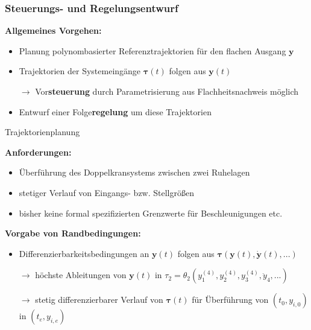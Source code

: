 \documentclass[
	ngerman,
	10pt,				%
	aspectratio=169 	%
]{beamer}
\begin{document}

\begin{frame}[label=control]
	\frametitle{Steuerungs- und Regelungsentwurf}
	\textbf{Allgemeines Vorgehen:}
	\begin{itemize}
		\item Planung polynombasierter Referenztrajektorien für den flachen Ausgang $\mathbf{y}$
		\pause
		\item Trajektorien der Systemeingänge $\boldsymbol{\tau}(t)$ folgen aus $\mathbf{y}(t)$
		\pause
		\item[$\rightarrow$] Vor\textbf{steuerung} durch Parametrisierung aus Flachheitsnachweis möglich
		\pause
		\item Entwurf einer Folge\textbf{regelung} um diese Trajektorien
	\end{itemize}

\end{frame}


\begin{frame}[t,fragile,label=trajektorien_1]{\large Trajektorienplanung}
	
	\textbf{Anforderungen:}
	\begin{itemize}
		\pause
		\item Überführung des Doppelkransystems zwischen zwei Ruhelagen
		\pause
		\item stetiger Verlauf von Eingangs- bzw. Stellgrößen
		\pause
		\item bisher keine formal spezifizierten Grenzwerte für Beschleunigungen etc.
	\end{itemize}
	
	\pause
	\bigskip
	\textbf{Vorgabe von Randbedingungen:}
	\begin{itemize}
		\pause
		\item Differenzierbarkeitsbedingungen an $\mathbf{y}(t)$ folgen aus $\boldsymbol{\tau}(\mathbf{y}(t), \dot{\mathbf{y}}(t), ...)$
		\pause
		\item[$\rightarrow$] höchste Ableitungen von $\mathbf{y}(t)$ in $\tau_2 = \theta_2 \left(y_1^{(4)}, y_2^{(4)}, y_3^{(4)}, \ddot{y}_4, ... \right)$
		\pause
		\item[$\rightarrow$] stetig differenzierbarer Verlauf von $\boldsymbol{\tau}(t)$ für Überführung von $(t_0, y_{i, 0})$ in $(t_e, y_{i, e})$
		
	\end{itemize}
	
\end{frame}
\end{document}
